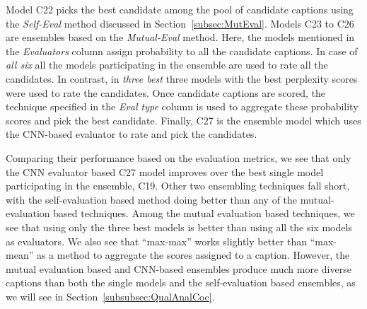 Model C22 picks the best candidate among the pool of candidate captions using
the \emph{Self-Eval} method discussed in Section~\ref{subsec:MutEval}.
Models C23 to C26 are ensembles based on the \emph{Mutual-Eval} method.
Here, the models mentioned in the \emph{Evaluators} column assign probability to
all the candidate captions.
In case of \emph{all six} all the models participating in the ensemble are used
to rate all the candidates.
In contrast, in \emph{three best} three models with the best perplexity scores
were used to rate the candidates.
Once candidate captions are scored, the technique specified in the \emph{Eval
type} column is used to aggregate these probability scores and pick the best
candidate.
Finally, C27 is the ensemble model which uses the CNN-based evaluator to rate and
pick the candidates.

Comparing their performance based on the evaluation metrics, we see that only the
CNN evaluator based C27 model improves over the best single model participating
in the ensemble, C19.
Other two ensembling techniques fall short, with the self-evaluation based
method doing better than any of the mutual-evaluation based techniques.
Among the mutual evaluation based techniques, we see that using only the three best
models is better than using all the six models as evaluators.
We also see that ``max-max'' works slightly better than ``max-mean'' as a method to
aggregate the scores assigned to a caption.
However, the mutual evaluation based and CNN-based ensembles produce much more
diverse captions than both the single models and the self-evaluation based
ensembles, as we will see in Section~\ref{subsubsec:QualAnalCoc}.

